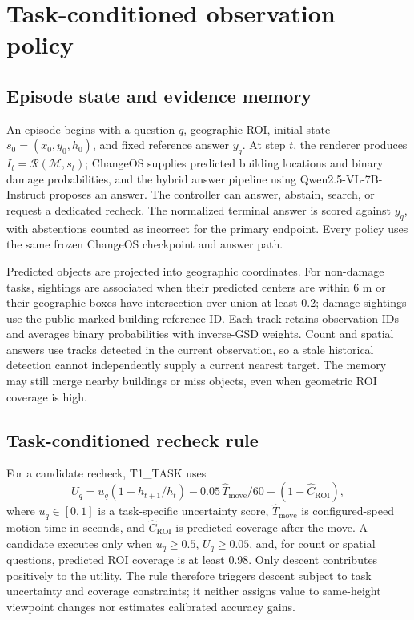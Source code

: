 \section{Task-conditioned observation policy}
\label{sec:agent}
\subsection{Episode state and evidence memory}
An episode begins with a question $q$, geographic ROI, initial state $s_0=(x_0,y_0,h_0)$, and fixed reference answer $y_q$. At step $t$, the renderer produces $I_t=\mathcal{R}(\mathcal{M},s_t)$; ChangeOS supplies predicted building locations and binary damage probabilities, and the hybrid answer pipeline using Qwen2.5-VL-7B-Instruct proposes an answer. The controller can answer, abstain, search, or request a dedicated recheck. The normalized terminal answer is scored against $y_q$, with abstentions counted as incorrect for the primary endpoint. Every policy uses the same frozen ChangeOS checkpoint and answer path.

Predicted objects are projected into geographic coordinates. For non-damage tasks, sightings are associated when their predicted centers are within 6 m or their geographic boxes have intersection-over-union at least 0.2; damage sightings use the public marked-building reference ID. Each track retains observation IDs and averages binary probabilities with inverse-GSD weights. Count and spatial answers use tracks detected in the current observation, so a stale historical detection cannot independently supply a current nearest target. The memory may still merge nearby buildings or miss objects, even when geometric ROI coverage is high.

\subsection{Task-conditioned recheck rule}
For a candidate recheck, T1\_TASK uses
\begin{equation}
 U_q=u_q(1-h_{t+1}/h_t)-0.05\,\widehat{T}_{\mathrm{move}}/60
 -(1-\widehat{C}_{\mathrm{ROI}}),
 \label{eq:taskutility}
\end{equation}
where $u_q\in[0,1]$ is a task-specific uncertainty score, $\widehat{T}_{\mathrm{move}}$ is configured-speed motion time in seconds, and $\widehat{C}_{\mathrm{ROI}}$ is predicted coverage after the move. A candidate executes only when $u_q\geq0.5$, $U_q\geq0.05$, and, for count or spatial questions, predicted ROI coverage is at least 0.98. Only descent contributes positively to the utility. The rule therefore triggers descent subject to task uncertainty and coverage constraints; it neither assigns value to same-height viewpoint changes nor estimates calibrated accuracy gains.

